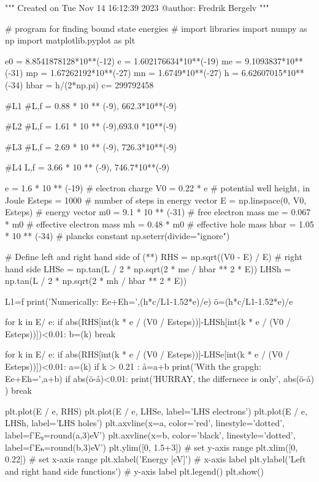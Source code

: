 
"""
Created on Tue Nov 14 16:12:39 2023
@author: Fredrik Bergelv
"""

# program for finding bound state energies
# import libraries
import numpy as np
import matplotlib.pyplot as plt

e0 = 8.8541878128*10**(-12)
e = 1.602176634*10**(-19)
me = 9.1093837*10**(-31)
mp = 1.67262192*10**(-27)
mn = 1.6749*10**(-27)          
h = 6.62607015*10**(-34)
hbar = h/(2*np.pi)
c= 299792458

#L1
#L,f = 0.88   * 10 ** (-9), 662.3*10**(-9) 

#L2
#L,f = 1.61   * 10 ** (-9),693.0 *10**(-9) 

#L3
#L,f = 2.69   * 10 ** (-9), 726.3*10**(-9) 

#L4
L,f = 3.66   * 10 ** (-9), 746.7*10**(-9) 


e = 1.6 * 10 ** (-19) # electron charge
V0 = 0.22 * e # potential well height, in Joule
Esteps = 1000 # number of steps in energy vector
E = np.linspace(0, V0, Esteps) # energy vector
m0 = 9.1 * 10 ** (-31) # free electron mass
me = 0.067 * m0 # effective electron mass
mh = 0.48 * m0 # effective hole mass
hbar = 1.05 * 10 ** (-34) # plancks constant
np.seterr(divide="ignore")


# Define left and right hand side of (**)
RHS = np.sqrt((V0 - E) / E) # right hand side
LHSe = np.tan(L / 2 * np.sqrt(2 * me / hbar ** 2 * E))
LHSh = np.tan(L / 2 * np.sqrt(2 * mh / hbar ** 2 * E))

L1=f
print('Numerically: Ee+Eh=',(h*c/L1-1.52*e)/e)
ö=(h*c/L1-1.52*e)/e

for k in E/ e:
    if abs(RHS[int(k * e / (V0 / Esteps))]-LHSh[int(k * e / (V0 / Esteps))])<0.01:
        b=(k)
        break

for k in E/ e:
    if abs(RHS[int(k * e / (V0 / Esteps))]-LHSe[int(k * e / (V0 / Esteps))])<0.01:
        a=(k)
    if k  > 0.21 :
        å=a+b
        print('With the grapgh: Ee+Eh=',a+b)
        if abs(ö-å)<0.01:
            print('HURRAY, the differnece is only', abs(ö-å) )
        break

plt.plot(E / e, RHS)
plt.plot(E / e, LHSe, label='LHS electrons')
plt.plot(E / e, LHSh, label='LHS holes')
plt.axvline(x=a, color='red', linestyle='dotted', label=f'E₉={round(a,3)}eV')
plt.axvline(x=b, color='black', linestyle='dotted', label=f'Eₕ={round(b,3)}eV')
plt.ylim([0, 1.5+3]) # set y-axis range
plt.xlim([0, 0.22]) # set x-axis range
plt.xlabel('Energy [eV]')  # x-axis label
plt.ylabel('Left and right hand side functions')  # y-axis label
plt.legend()
plt.show()